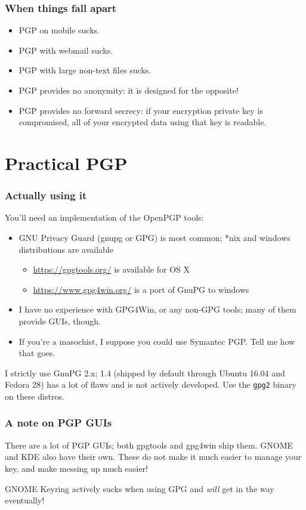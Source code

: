 \documentclass[aspectratio=1610,bigger,utf8]{beamer}
\begin{document}
\begin{frame}
	\frametitle{When things fall apart}
	\begin{itemize}
		\item PGP on mobile sucks.
		\item PGP with webmail sucks.
		\item PGP with large non-text files sucks.
		\item PGP provides no anonymity: it is designed for the
			opposite!
		\item PGP provides no forward secrecy: if your encryption
			private key is compromised, all of your encrypted data
			using that key is readable.

	\end{itemize}
\end{frame}

\section{Practical PGP}
\begin{frame}
	\frametitle{Actually using it}
	You'll need an implementation of the OpenPGP tools:
	\begin{itemize}
		\item GNU Privacy Guard (gnupg or GPG) is most common; *nix and
			windows distributions are available
			\begin{itemize}
				\item \url{https://gpgtools.org/} is available
					for OS X
				\item \url{https://www.gpg4win.org/} is a port
					of GnuPG to windows
			\end{itemize}
		\item I have no experience with GPG4Win, or any non-GPG tools;
			many of them provide GUIs, though.
		\item If you're a masochist, I suppose you could use
			\alert{Symantec PGP}. Tell me how that goes.
	\end{itemize}
	I strictly use GnuPG 2.x; 1.4 (shipped by default through Ubuntu 16.04
	and Fedora 28) has a lot of flaws and is not actively developed. Use
	the \texttt{gpg2} binary on these distros.
\end{frame}
\begin{frame}
	\frametitle{A note on PGP GUIs}
	There are a lot of PGP GUIs; both gpgtools and gpg4win ship them. GNOME
	and KDE also have their own. These do not make it much easier to manage
	your key, and make messing up much easier!

	GNOME Keyring actively sucks when using GPG and \emph{will} get in the
	way eventually!
\end{frame}
\end{document}
